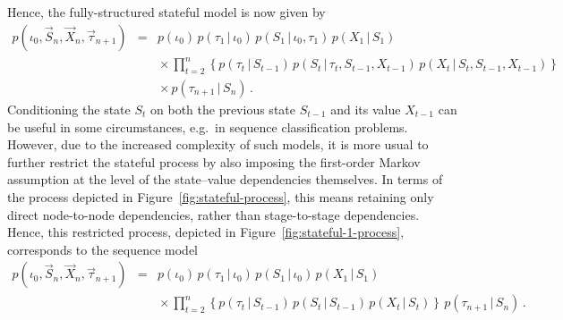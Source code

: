 \documentclass[a4paper]{article}
\begin{document}
Hence, the fully-structured stateful model is now given by
\begin{eqnarray}
p(\iota_0,\vec{S}_n,\vec{X}_n,\vec{\tau}_{n+1}) & = & 
p(\iota_0)\,p(\tau_1\,|\,\iota_0)\,p(S_1\,|\,\iota_0,\tau_1)\,p(X_1\,|\,S_1)
\nonumber\\&&
{}\times\prod_{t=2}^{n}\left\{p(\tau_t\,|\,S_{t-1})\,p(S_t\,|\,\tau_t,S_{t-1},X_{t-1})
\,p(X_t\,|\,S_t,S_{t-1},X_{t-1})\right\}
\nonumber\\&&
{}\times p(\tau_{n+1}\,|\,S_n)
\,.
\end{eqnarray}
Conditioning the state $S_t$ on both the previous state $S_{t-1}$ and its value $X_{t-1}$
can be useful in some circumstances, e.g.\ in sequence classification problems.
However, due to the increased complexity of such models, it is more usual to further restrict the stateful process
by also imposing the first-order Markov assumption at the level
of the state--value dependencies themselves. In terms of the process depicted in Figure~\ref{fig:stateful-process},
this means retaining only direct node-to-node dependencies, rather than stage-to-stage dependencies.
Hence, this restricted process, depicted in Figure~\ref{fig:stateful-1-process},
corresponds to the sequence model
\begin{eqnarray}
p(\iota_0,\vec{S}_n,\vec{X}_n,\vec{\tau}_{n+1}) & = & 
p(\iota_0)\,p(\tau_1\,|\,\iota_0)\,p(S_1\,|\,\iota_0)\,p(X_1\,|\,S_1)
\nonumber\\&&
{}\times\prod_{t=2}^{n}\left\{p(\tau_t\,|\,S_{t-1})\,p(S_t\,|\,S_{t-1})\,p(X_t\,|\,S_t)\right\}
\,p(\tau_{n+1}\,|\,S_n)
\,.
\label{eq:stateful-1-model}
\end{eqnarray}
\end{document}
